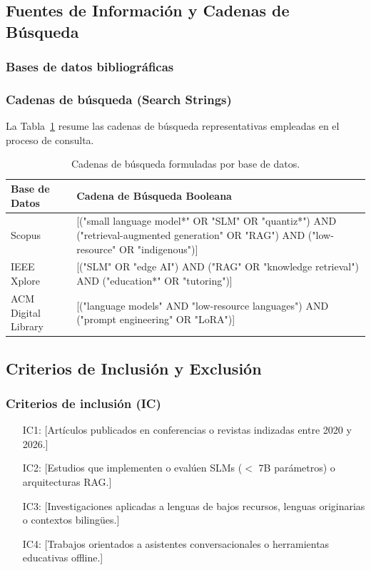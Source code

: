 \subsection{Fuentes de Información y Cadenas de Búsqueda}

\subsubsection{Bases de datos bibliográficas}

\subsubsection{Cadenas de búsqueda (Search Strings)}

La Tabla~\ref{tab:cadenas_busqueda} resume las cadenas de búsqueda representativas empleadas en el proceso de consulta.

\begin{table}[t]
\centering
\caption{Cadenas de búsqueda formuladas por base de datos.}
\label{tab:cadenas_busqueda}
\begin{tabularx}{\textwidth}{p{3.2cm} X}
\toprule
\textbf{Base de Datos} & \textbf{Cadena de Búsqueda Booleana} \\
\midrule
Scopus & [("small language model*" OR "SLM" OR "quantiz*") AND ("retrieval-augmented generation" OR "RAG") AND ("low-resource" OR "indigenous")] \\
\addlinespace
IEEE Xplore & [("SLM" OR "edge AI") AND ("RAG" OR "knowledge retrieval") AND ("education*" OR "tutoring")] \\
\addlinespace
ACM Digital Library & [("language models" AND "low-resource languages") AND ("prompt engineering" OR "LoRA")] \\
\bottomrule
\end{tabularx}
\end{table}

\subsection{Criterios de Inclusión y Exclusión}

\subsubsection{Criterios de inclusión (IC)}
\begin{enumerate}[(a)]
	\item [IC1:] [Artículos publicados en conferencias o revistas indizadas entre 2020 y 2026.]
	\item [IC2:] [Estudios que implementen o evalúen SLMs ($<$ 7B parámetros) o arquitecturas RAG.]
	\item [IC3:] [Investigaciones aplicadas a lenguas de bajos recursos, lenguas originarias o contextos bilingües.]
	\item [IC4:] [Trabajos orientados a asistentes conversacionales o herramientas educativas offline.]
\end{enumerate}

